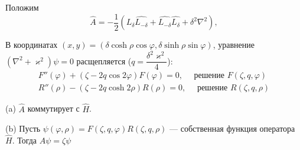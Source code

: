 \begin{frame} 

Положим 
$$
\widehat{A} = -\frac{1}{2}(\widehat{L_\delta} \widehat{L_{-\delta}} + \widehat{L_{-\delta}} \widehat{L_\delta}+ \delta^2 \nabla ^2),
$$

В координатах $(x, y) = (\delta \cosh \rho \cos \varphi,  \delta \sinh \rho \sin \varphi)$, уравнение $(\nabla^2 + \varkappa^2) \psi = 0 $ расщепляется ($q = \dfrac{\delta^2 \varkappa^2}{4}$):
\begin{align*}
F''(\varphi) + (\zeta-2q \cos 2\varphi) F(\varphi) = 0, \quad \text{ решение }  F(\zeta, q, \varphi) \\
R''(\rho) - (\zeta-2q \cosh 2\rho) R(\rho) = 0, \quad \text{ решение }  R(\zeta, q, \rho)
\end{align*}

\begin{mytheorem}[C]
\label{th:L}
(a) $\hat A$ коммутирует с  $\hat H$.

(b) Пусть   $\psi(\varphi, \rho) = F(\zeta, q, \varphi) R(\zeta, q, \rho)$ --- собственная функция оператора $\hat H$. %
Тогда
$\hat A \psi = \zeta \psi$
\end{mytheorem}

\end{frame} 


